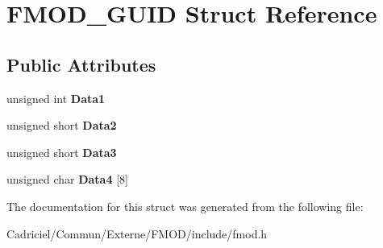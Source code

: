 \hypertarget{struct_f_m_o_d___g_u_i_d}{\section{F\-M\-O\-D\-\_\-\-G\-U\-I\-D Struct Reference}
\label{struct_f_m_o_d___g_u_i_d}
}
\subsection*{Public Attributes}
\begin{DoxyCompactItemize}
\item 
\hypertarget{struct_f_m_o_d___g_u_i_d_ade5cc5a3c9665147a488c8a9e2ea211c}{unsigned int {\bfseries Data1}}\label{struct_f_m_o_d___g_u_i_d_ade5cc5a3c9665147a488c8a9e2ea211c}

\item 
\hypertarget{struct_f_m_o_d___g_u_i_d_ac5805cdbaf5cfa2113d637e11f6ad36e}{unsigned short {\bfseries Data2}}\label{struct_f_m_o_d___g_u_i_d_ac5805cdbaf5cfa2113d637e11f6ad36e}

\item 
\hypertarget{struct_f_m_o_d___g_u_i_d_a98f6f2f06cad235236cbc86099aa4e96}{unsigned short {\bfseries Data3}}\label{struct_f_m_o_d___g_u_i_d_a98f6f2f06cad235236cbc86099aa4e96}

\item 
\hypertarget{struct_f_m_o_d___g_u_i_d_a3a1337ea3f0bec8fbddd197ebdb29cf7}{unsigned char {\bfseries Data4} \mbox{[}8\mbox{]}}\label{struct_f_m_o_d___g_u_i_d_a3a1337ea3f0bec8fbddd197ebdb29cf7}

\end{DoxyCompactItemize}


The documentation for this struct was generated from the following file\-:\begin{DoxyCompactItemize}
\item 
Cadriciel/\-Commun/\-Externe/\-F\-M\-O\-D/include/fmod.\-h\end{DoxyCompactItemize}
